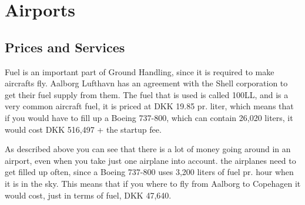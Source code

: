 \chapter{Airports}
\section{Prices and Services}

Fuel is an important part of Ground Handling, since it is required to make aircrafts fly. Aalborg Lufthavn has an agreement with the Shell corporation to get their fuel supply from them. The fuel that is used is called 100LL, and is a very common aircraft fuel, it is priced at DKK 19.85 pr. liter, which means that if you would have to fill up a Boeing 737-800, which can contain 26,020 liters, it would cost DKK 516,497 + the startup fee.

As described above you can see that there is a lot of money going around in an airport, even when you take just one airplane into account. the airplanes need to get filled up often, since a Boeing 737-800 uses 3,200 liters of fuel pr. hour when it is in the sky. This means that if you where to fly from Aalborg to Copehagen it would cost, just in terms of fuel, DKK 47,640.

%